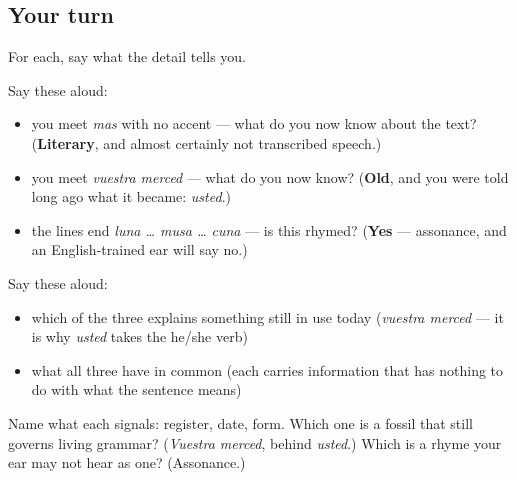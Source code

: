 \subsection*{Your turn}
For each, say what the detail tells you.

Say these aloud:

\begin{itemize}
\raggedright
  \item you meet \emph{mas} with no accent — what do you now know about the text? (\textbf{Literary}, and almost certainly not transcribed speech.)
  \item you meet \emph{vuestra merced} — what do you now know? (\textbf{Old}, and you were told long ago what it became: \emph{usted}.)
  \item the lines end \emph{luna … musa … cuna} — is this rhymed? (\textbf{Yes} — assonance, and an English-trained ear will say no.)
\end{itemize}

Say these aloud:

\begin{itemize}
\raggedright
  \item which of the three explains something still in use today (\emph{vuestra merced} — it is why \emph{usted} takes the he/she verb)
  \item what all three have in common (each carries information that has nothing to do with what the sentence means)
\end{itemize}

\begin{tcolorbox}[breakable,colback=teal!4,colframe=teal!35!black,title={Before you move on}]
Name what each signals: register, date, form. Which one is a fossil that still governs living grammar? (\emph{Vuestra merced}, behind \emph{usted}.) Which is a rhyme your ear may not hear as one? (Assonance.)
\end{tcolorbox}
